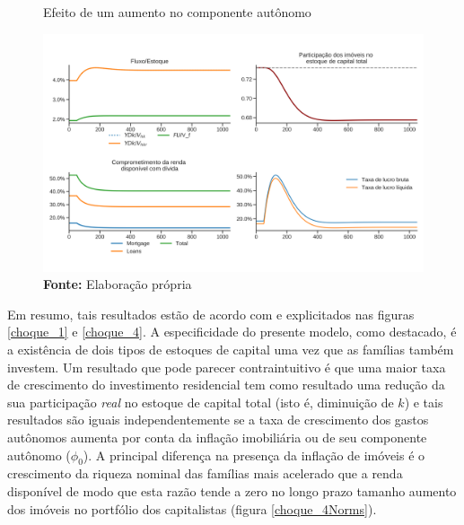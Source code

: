 \begin{figure}[H]
	\centering
	\caption{Efeito de um aumento no componente autônomo}
	\label{choque_1Norms}
	\includegraphics[width=\textwidth]{../../Modelo/Versoes/Shock_1Norms.png}
	\caption*{\textbf{Fonte:} Elaboração própria}
\end{figure}



Em resumo, tais resultados estão de acordo com \textcite{freitas_growth_2015} e explicitados nas figuras \ref{choque_1} e \ref{choque_4}. A especificidade do presente modelo, como destacado, é a existência de dois tipos de estoques de capital uma vez que as famílias também investem. Um resultado que pode parecer contraintuitivo é que uma maior taxa de crescimento do investimento residencial tem como resultado uma redução  da sua participação \textit{real} no estoque de capital total (isto é, diminuição de $k$) e tais resultados são iguais independentemente se a taxa de crescimento dos gastos autônomos aumenta por conta da inflação imobiliária ou de seu componente autônomo ($\phi_0$). 
A principal diferença na presença da inflação de imóveis é o crescimento da riqueza nominal das famílias mais acelerado que a renda disponível de modo que esta razão tende a zero no longo prazo tamanho aumento dos imóveis no portfólio dos capitalistas (figura \ref{choque_4Norms}).


